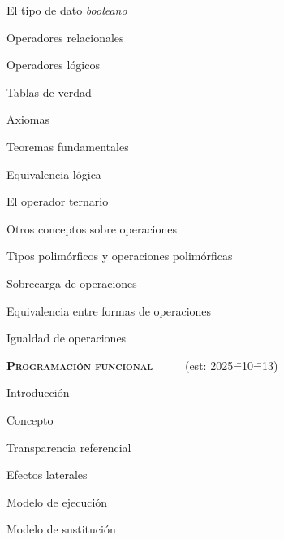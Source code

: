 \begin{longenum}
\begin{longenum}
        \begin{longenum}
            \item El tipo de dato \textit{booleano}
            \item Operadores relacionales
            \item Operadores lógicos
            \begin{longenum}
                \item Tablas de verdad
            \end{longenum}
            \item Axiomas
            \item Teoremas fundamentales
            \item Equivalencia lógica
            \item El operador ternario
        \end{longenum}
        \item Otros conceptos sobre operaciones
        \begin{longenum}
            \item Tipos polimórficos y operaciones polimórficas
            \item Sobrecarga de operaciones
            \item Equivalencia entre formas de operaciones
            \item Igualdad de operaciones
        \end{longenum}
    \end{longenum}
    \item \textbf{\textsc{Programación funcional}} \ \ \ \ \ (est: 2025\==10\==13)
    \begin{longenum}
        \item Introducción
        \begin{longenum}
            \item Concepto
            \item Transparencia referencial
            \begin{longenum}
                \item Efectos laterales
            \end{longenum}
            \item Modelo de ejecución
            \begin{longenum}
                \item Modelo de sustitución
            \end{longenum}
        \end{longenum}

\end{longenum}
\end{longenum}
